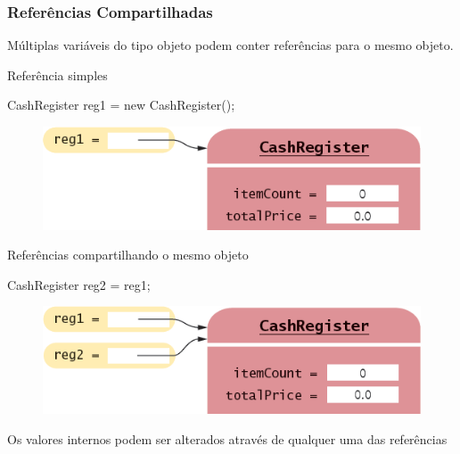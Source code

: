 \documentclass[xcolor={dvipsnames,table},aspectratio=169]{beamer}
\begin{document}
\begin{frame}[fragile]\frametitle{Referências Compartilhadas}
\begin{itemize}
{\small
	\item Múltiplas variáveis do tipo objeto podem conter referências para o mesmo objeto.
	\begin{itemize}
{\small
		\item Referência simples
\begin{javacode}
CashRegister reg1 = new CashRegister();
\end{javacode}
\begin{figure}[h]
	\includegraphics[height=0.10\paperheight,center]{pucrs-ep-fprog-unidade_07-objetos_e_classes-laminas-referencia_a_objeto_1.png}
\end{figure}
		\item Referências compartilhando o mesmo objeto
\begin{javacode}
CashRegister reg2 = reg1;
\end{javacode}
\begin{figure}[h]
	\includegraphics[height=0.10\paperheight,center]{pucrs-ep-fprog-unidade_07-objetos_e_classes-laminas-referencia_a_objeto_2.png}
\end{figure}
}
	\end{itemize}
	\item Os valores internos podem ser alterados através de qualquer uma das referências
}
\end{itemize}
\end{frame}
\end{document}
